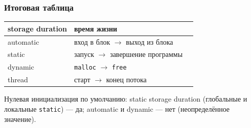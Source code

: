 \documentclass[compress, 8pt, aspectratio=169]{beamer}
\begin{document}
\begin{frame}

    \frametitle{Итоговая таблица}

    \begin{center}

        \setlength{\tabcolsep}{4pt}
        \begin{tabular}{lll}
            \hline
            \textbf{storage duration} & \textbf{время жизни} \\
            \hline
            automatic &
                вход в блок $\rightarrow$ выход из блока \\
            static &
                запуск $\rightarrow$ завершение программы \\
            dynamic &
                \texttt{malloc} $\rightarrow$ \texttt{free} \\
            thread &
                старт $\rightarrow$ конец потока \\
            \hline
        \end{tabular}

    \end{center}

    \bigbreak

    \scriptsize
    Нулевая инициализация по умолчанию: static storage
    duration (глобальные и локальные \texttt{static}) --- да;
    automatic и dynamic --- нет (неопределённое значение).

\end{frame}
\end{document}
